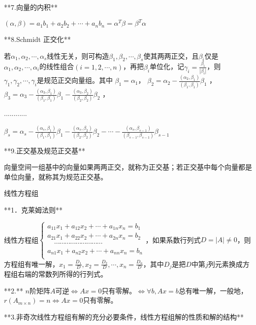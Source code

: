 **7.向量的内积**

$(\alpha,\beta) = a_{1}b_{1} + a_{2}b_{2} + \cdots + a_{n}b_{n} = \alpha^{T}\beta = \beta^{T}\alpha$

**8.Schmidt 正交化**

若$\alpha_{1},\alpha_{2},\cdots,\alpha_{s}$线性无关，则可构造$\beta_{1},\beta_{2},\cdots,\beta_{s}$使其两两正交，且$\beta_{i}$仅是$\alpha_{1},\alpha_{2},\cdots,\alpha_{i}$的线性组合$(i= 1,2,\cdots,n)$，再把$\beta_{i}$单位化，记$\gamma_{i} =\frac{\beta_{i}}{\left| \beta_{i}\right|}$，则$\gamma_{1},\gamma_{2},\cdots,\gamma_{i}$是规范正交向量组。其中
$\beta_{1} = \alpha_{1}$， $\beta_{2} = \alpha_{2} -\frac{(\alpha_{2},\beta_{1})}{(\beta_{1},\beta_{1})}\beta_{1}$ ， $\beta_{3} =\alpha_{3} - \frac{(\alpha_{3},\beta_{1})}{(\beta_{1},\beta_{1})}\beta_{1} -\frac{(\alpha_{3},\beta_{2})}{(\beta_{2},\beta_{2})}\beta_{2}$ ，

............

$\beta_{s} = \alpha_{s} - \frac{(\alpha_{s},\beta_{1})}{(\beta_{1},\beta_{1})}\beta_{1} - \frac{(\alpha_{s},\beta_{2})}{(\beta_{2},\beta_{2})}\beta_{2} - \cdots - \frac{(\alpha_{s},\beta_{s - 1})}{(\beta_{s - 1},\beta_{s - 1})}\beta_{s - 1}$

**9.正交基及规范正交基**

向量空间一组基中的向量如果两两正交，就称为正交基；若正交基中每个向量都是单位向量，就称其为规范正交基。

线性方程组

**1．克莱姆法则**

线性方程组$\begin{cases}  a_{11}x_{1} + a_{12}x_{2} + \cdots +a_{1n}x_{n} = b_{1} \\   a_{21}x_{1} + a_{22}x_{2} + \cdots + a_{2n}x_{n} =b_{2} \\   \quad\cdots\cdots\cdots\cdots\cdots\cdots\cdots\cdots\cdots \\ a_{n1}x_{1} + a_{n2}x_{2} + \cdots + a_{{nn}}x_{n} = b_{n} \\ \end{cases}$，如果系数行列式$D = \left| A \right| \neq 0$，则方程组有唯一解，$x_{1} = \frac{D_{1}}{D},x_{2} = \frac{D_{2}}{D},\cdots,x_{n} =\frac{D_{n}}{D}$，其中$D_{j}$是把$D$中第$j$列元素换成方程组右端的常数列所得的行列式。

**2.** $n$阶矩阵$A$可逆$\Leftrightarrow Ax = 0$只有零解。$\Leftrightarrow\forall b,Ax = b$总有唯一解，一般地，$r(A_{m \times n}) = n \Leftrightarrow Ax= 0$只有零解。

**3.非奇次线性方程组有解的充分必要条件，线性方程组解的性质和解的结构**

